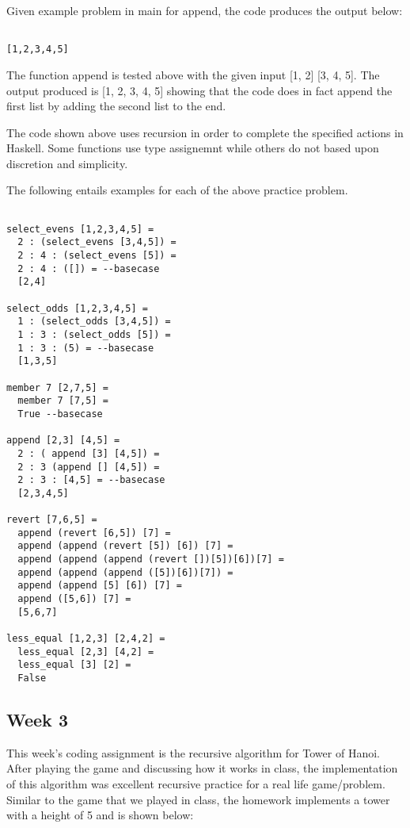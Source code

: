 \documentclass{article}
\theoremstyle{theorem}
\theoremstyle{definition}
\theoremstyle{remark}
\begin{document}
Given example problem in main for append, the code produces the output below:

\begin{lstlisting}

[1,2,3,4,5]

\end{lstlisting}

The function append is tested above with the given input [1, 2] [3, 4, 5]. The output produced is [1, 2, 3, 4, 5] showing that the code does in fact append the first list by adding the second list to the end.

\medskip\noindent
The code shown above uses recursion in order to complete the specified actions in Haskell. Some functions use type assignemnt while others do not based upon discretion and simplicity.

The following entails examples for each of the above practice problem.

\begin{lstlisting}

select_evens [1,2,3,4,5] =
  2 : (select_evens [3,4,5]) =
  2 : 4 : (select_evens [5]) =
  2 : 4 : ([]) = --basecase
  [2,4]

select_odds [1,2,3,4,5] =
  1 : (select_odds [3,4,5]) =
  1 : 3 : (select_odds [5]) =
  1 : 3 : (5) = --basecase
  [1,3,5]

member 7 [2,7,5] =
  member 7 [7,5] =
  True --basecase

append [2,3] [4,5] =
  2 : ( append [3] [4,5]) =
  2 : 3 (append [] [4,5]) =
  2 : 3 : [4,5] = --basecase
  [2,3,4,5]

revert [7,6,5] =
  append (revert [6,5]) [7] =
  append (append (revert [5]) [6]) [7] =
  append (append (append (revert [])[5])[6])[7] =
  append (append (append ([5])[6])[7]) =
  append (append [5] [6]) [7] =
  append ([5,6]) [7] =
  [5,6,7]

less_equal [1,2,3] [2,4,2] =
  less_equal [2,3] [4,2] =
  less_equal [3] [2] =
  False

\end{lstlisting}

\subsection{Week 3}
This week's coding assignment is the recursive algorithm for Tower of Hanoi. After playing the game and discussing how it works in class, the implementation of this algorithm was excellent recursive practice for a real life game/problem.
Similar to the game that we played in class, the homework implements a tower with a height of 5 and is shown below:
\end{document}
